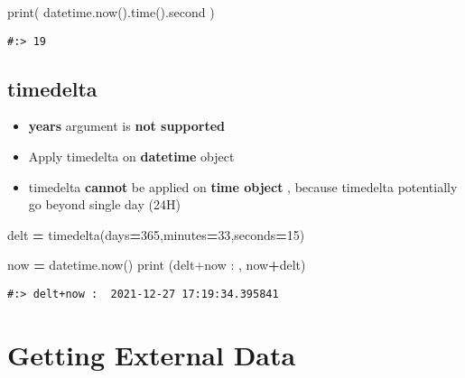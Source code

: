 \documentclass[
]{book}
\newenvironment{Shaded}{\begin{snugshade}}{\end{snugshade}}
\newcommand{\BuiltInTok}[1]{#1}
\newcommand{\DecValTok}[1]{\textcolor[rgb]{0.06,0.06,0.06}{#1}}
\newcommand{\NormalTok}[1]{#1}
\newcommand{\OperatorTok}[1]{\textcolor[rgb]{0.43,0.43,0.43}{\textbf{#1}}}
\newcommand{\StringTok}[1]{\textcolor[rgb]{0.5,0.5,0.5}{#1}}
\providecommand{\tightlist}{%
  \setlength{\itemsep}{0pt}\setlength{\parskip}{0pt}}
\begin{document}
\begin{Shaded}
\begin{Highlighting}[]
\BuiltInTok{print}\NormalTok{( datetime.now().time().second )}
\end{Highlighting}
\end{Shaded}

\begin{verbatim}
#:> 19
\end{verbatim}

\hypertarget{timedelta}{%
\section{timedelta}\label{timedelta}}

\begin{itemize}
\tightlist
\item
  \textbf{years} argument is \textbf{not supported}\\
\item
  Apply timedelta on \textbf{datetime} object\\
\item
  timedelta \textbf{cannot} be applied on \textbf{time object} , because timedelta potentially go beyond single day (24H)
\end{itemize}

\begin{Shaded}
\begin{Highlighting}[]
\NormalTok{delt }\OperatorTok{=}\NormalTok{ timedelta(days}\OperatorTok{=}\DecValTok{365}\NormalTok{,minutes}\OperatorTok{=}\DecValTok{33}\NormalTok{,seconds}\OperatorTok{=}\DecValTok{15}\NormalTok{)}
\end{Highlighting}
\end{Shaded}

\begin{Shaded}
\begin{Highlighting}[]
\NormalTok{now }\OperatorTok{=}\NormalTok{ datetime.now()}
\BuiltInTok{print}\NormalTok{ (}\StringTok{\textquotesingle{}delt+now : \textquotesingle{}}\NormalTok{, now}\OperatorTok{+}\NormalTok{delt)}
\end{Highlighting}
\end{Shaded}

\begin{verbatim}
#:> delt+now :  2021-12-27 17:19:34.395841
\end{verbatim}

\hypertarget{getting-external-data}{%
\chapter{Getting External Data}\label{getting-external-data}}
\end{document}
